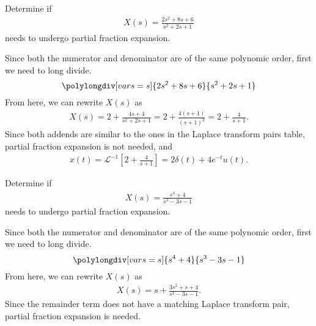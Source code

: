 \documentclass{report}
\begin{document}
\begin{example}
    Determine if 
    \begin{align*}
        X(s) = \frac{2s^2+8s+6}{s^2+2s+1}
    \end{align*}
    needs to undergo partial fraction expansion.
\end{example}
\begin{solution}
    Since both the numerator and denominator are of the same polynomic order, first we need to long divide. \\
    \[ \polylongdiv[vars=s]{2s^2+8s+6}{s^2+2s+1} \]
    From here, we can rewrite $X(s)$ as 
    \begin{align*}
        X(s) = 2 + \frac{4s+4}{s^2+2s+1} = 2 + \frac{4(s+1)}{(s+1)^2} = 2 + \frac{4}{s+1}.
    \end{align*}
    Since both addends are similar to the ones in the Laplace transform pairs table, partial fraction expansion is not needed, and 
    \begin{align*}
        x(t) = \mathcal{L}^{-1}\left[2 + \frac{4}{s+1}\right] = 2\delta(t) + 4e^{-t}u(t).
    \end{align*}
\end{solution}

\begin{example}
    Determine if 
    \begin{align*}
        X(s) = \frac{s^4+4}{s^3-3s-1}
    \end{align*}
    needs to undergo partial fraction expansion.
\end{example}
\begin{solution}
    Since both the numerator and denominator are of the same polynomic order, first we need to long divide. \\
    \[ \polylongdiv[vars=s]{s^4+4}{s^3-3s-1} \]
    From here, we can rewrite $X(s)$ as 
    \begin{align*}
        X(s) = s + \frac{3s^2+s+4}{s^3-3s-1}.
    \end{align*}
    Since the remainder term does not have a matching Laplace transform pair, partial fraction expansion is needed.
\end{solution}
\end{document}
